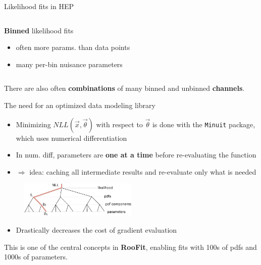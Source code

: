 \documentclass[aspectratio=169]{beamer}
\begin{document}
\begin{frame}{Likelihood fits in HEP}
\begin{columns}
\begin{column}{0.5\textwidth}
\begin{figure}
    \end{figure}
    \textbf{Binned} likelihood fits
    \begin{itemize}
        \item often more params. than data points
        \item many per-bin nuisance parameters
    \end{itemize}
\end{column}
\end{columns}
\vspace{0.5cm}
    There are also often \textbf{combinations} of many binned and unbinned \textbf{channels}.
\end{frame}

\begin{frame}[fragile]{The need for an optimized data modeling library}
  \begin{itemize}
      \item Minimizing $NLL(\vec{x},\vec{\theta})$ with respect to $\vec{\theta}$ is done with the \texttt{Minuit} package, which uses numerical differentiation
    \item In num. diff, parameters are \textbf{one at a time} before re-evaluating the function
    \item $\Rightarrow$ idea: caching all intermediate results and re-evaluate only what is needed
  \end{itemize}
    \begin{figure}
        \includegraphics[width=0.5\textwidth]{graph.pdf}
    \end{figure}
  \begin{itemize}
      \item Drastically decreases the cost of gradient evaluation
  \end{itemize}

  \vspace{0.3cm}

    This is one of the central concepts in \textbf{RooFit}, enabling fits with 100s of pdfs and 1000s of parameters.
\end{frame}
\end{document}
